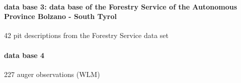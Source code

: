\documentclass[preprint,12pt,authoryear]{elsarticle}
\begin{document}
\paragraph{data base 3: data base of the Forestry Service of the Autonomous
Province Bolzano - South Tyrol} 

42 pit descriptions from the Forestry Service data set

\paragraph{data base 4} 

227 auger observations (WLM)

\begin{table}[ht]
\centering
\tiny
\begin{tabular}{p{2.0cm}p{3.0cm}p{5.0cm}p{1.8cm}}


\end{tabular}
\end{table}
\end{document}
